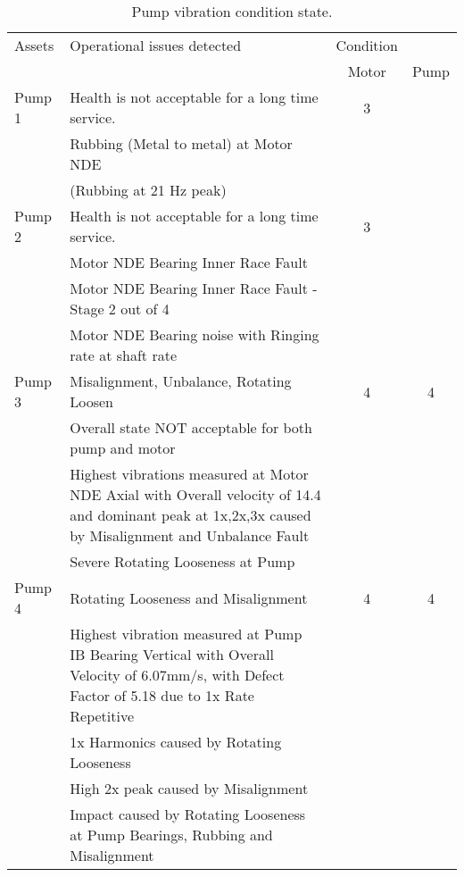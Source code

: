 \begin{table}[!h]
	\caption{Pump vibration condition state.}
	\label{ch045_tbl_vibration_data}
	{\footnotesize
\begin{tabular}{l|p{8cm}|c|c}

\hline
Assets & Operational issues detected & \multicolumn{1}{l}{Condition} &  \\ 
\cline{3-4}
 &  & Motor & Pump \\ 
\hline
Pump 1 & Health is not acceptable for a long time service. & 3 &  \\ 
 & Rubbing (Metal to metal) at Motor NDE &  &  \\ 
 & (Rubbing at 21 Hz peak) &  &  \\ 
\hline
Pump 2 & Health is not acceptable for a long time service. & 3 &  \\ 
 & Motor NDE Bearing Inner Race Fault &  &  \\ 
 & Motor NDE Bearing Inner Race Fault - Stage 2 out of 4 &  &  \\ 
 & Motor NDE Bearing noise with Ringing rate at shaft rate &  &  \\ 
\hline
Pump 3 & Misalignment, Unbalance, Rotating Loosen & 4 & 4 \\ 
 & Overall state NOT acceptable for both pump and motor &  &  \\ 
 & Highest vibrations measured at Motor NDE Axial with Overall velocity of 14.4 and dominant peak at 1x,2x,3x caused by Misalignment and Unbalance Fault &  &  \\ 
 & Severe Rotating Looseness at Pump &  &  \\ 
\hline
Pump 4 & Rotating Looseness and Misalignment & 4 & 4 \\ 
 & Highest vibration measured at Pump IB Bearing Vertical with Overall Velocity of 6.07mm/s, with Defect Factor of 5.18 due to 1x Rate Repetitive &  &  \\ 
 & 1x Harmonics caused by Rotating Looseness &  &  \\ 
 & High 2x peak caused by Misalignment &  &  \\ 
 & Impact caused by Rotating Looseness at Pump Bearings, Rubbing and Misalignment &  &  \\ 
\hline


\end{tabular}
	}
\end{table}
